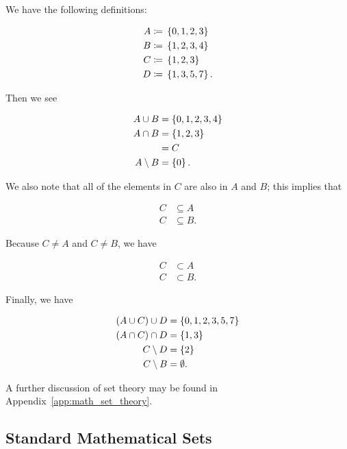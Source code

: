 \begin{example}
We have the following definitions:

\begin{align}
    A &\coloneqq{} \left\{ 0, 1, 2, 3 \right\}
        \nonumber\\
    B &\coloneqq{} \left\{ 1, 2, 3, 4 \right\}
        \nonumber\\
    C &\coloneqq{} \left\{ 1, 2, 3 \right\}
        \nonumber\\
    D &\coloneqq{} \left\{ 1, 3, 5, 7 \right\}.
\end{align}

\noindent
Then we see

\begin{align}
    A \cup B &= \left\{ 0, 1, 2, 3, 4 \right\} \nonumber\\
    A \cap B &= \left\{ 1, 2, 3 \right\} \nonumber\\
        &= C \nonumber\\
    A \setminus B &= \left\{ 0 \right\}.
\end{align}

\noindent
We also note that all of the elements in $C$ are also in $A$ and $B$;
this implies that

\begin{align}
    C &\subseteq A
        \nonumber\\
    C &\subseteq B.
\end{align}

\noindent
Because $C\ne A$ and $C\ne B$, we have

\begin{align}
    C &\subset A
        \nonumber\\
    C &\subset B.
\end{align}

\noindent
Finally, we have

\begin{align}
    (A \cup C) \cup D &= \left\{ 0, 1, 2, 3, 5, 7 \right\} \nonumber\\
    (A \cap C) \cap D &= \left\{ 1, 3 \right\} \nonumber\\
    C \setminus D &= \left\{ 2 \right\} \nonumber\\
    C \setminus B &= \emptyset.
\end{align}
\end{example}

A further discussion of set theory may be found in
Appendix~\ref{app:math_set_theory}.

\subsection{Standard Mathematical Sets}
\label{ssec:standard_math_sets}

